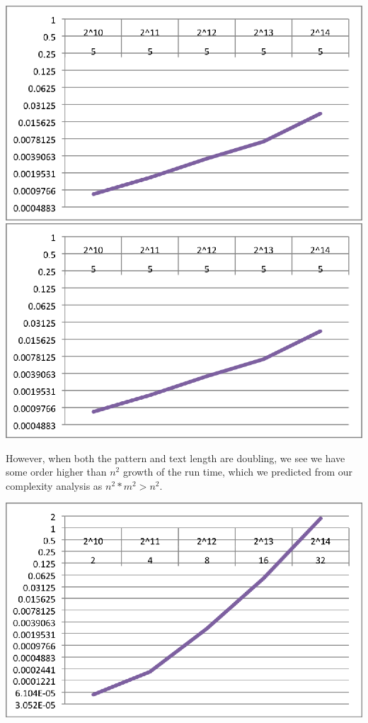 \documentclass{chi2005}
\begin{document}
\includegraphics[scale=0.7]{BFFixedM.eps}
\includegraphics[scale=0.7]{BFFixedN.eps}

However, when both the pattern and text length are doubling, we see we have some order higher than $n^2$ growth of the run time, which we predicted from our complexity analysis as $n^2*m^2 > n^2$.

\includegraphics[scale=0.7]{BFVarM.eps}
\end{document}
